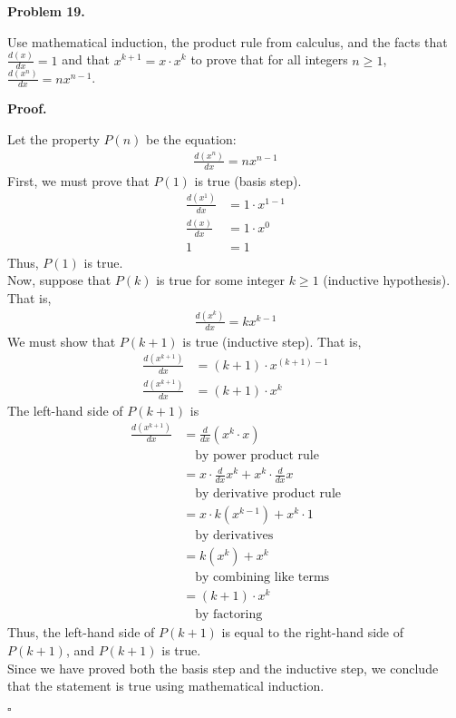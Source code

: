\documentclass{article}
\newenvironment{problem}[1]{
    \begin{mdframed}[backgroundcolor=gray!20, skipabove=\baselineskip, skipbelow=\baselineskip, nobreak=true, innerleftmargin=10pt, innerrightmargin=10pt, innertopmargin=10pt, innerbottommargin=10pt]
    \textbf{Problem #1.}
}{
    \end{mdframed}
}
\newenvironment{proof}{
    \begin{mdframed}[nobreak=false, innerleftmargin=10pt, innerrightmargin=10pt, innertopmargin=10pt, innerbottommargin=10pt]
    \textbf{Proof.}
}{
    \hfill $\square$
    \end{mdframed}
}
\begin{document}
    \begin{problem}{19}
        Use mathematical induction, the product rule from calculus, and the facts that $\frac{d(x)}{dx} = 1$ and that $x^{k+1} = x \cdot x^k$ to prove that for all integers $n \geq 1$, $\frac{d(x^n)}{dx} = nx^{n-1}$.
    \end{problem}
    \begin{proof}
        Let the property $P(n)$ be the equation:
        \begin{align*}
            \frac{d(x^n)}{dx} = nx^{n-1}
        \end{align*}
        First, we must prove that $P(1)$ is true (basis step). \\
        \begin{align*}
            \frac{d(x^1)}{dx} &= 1 \cdot x^{1-1} \\
            \frac{d(x)}{dx} &= 1 \cdot x^{0} \\
            1 &= 1
        \end{align*}
        Thus, $P(1)$ is true. \\
        Now, suppose that $P(k)$ is true for some integer $k \geq 1$ (inductive hypothesis). That is,
        \begin{align*}
            \frac{d(x^k)}{dx} = kx^{k-1}
        \end{align*}
        We must show that $P(k+1)$ is true (inductive step). That is,
        \begin{align*}
            \frac{d(x^{k+1})}{dx} &= (k+1) \cdot x^{(k+1)-1} \\
            \frac{d(x^{k+1})}{dx} &= (k+1) \cdot x^{k}
        \end{align*}
        The left-hand side of $P(k+1)$ is
        \begin{align*}
            \frac{d(x^{k+1})}{dx} &=\frac{d}{dx}(x^k \cdot x) \\
            & \quad \text{by power product rule} \\
            &= x \cdot \frac{d}{dx}x^k + x^k \cdot \frac{d}{dx}x \\
            & \quad \text{by derivative product rule} \\
            &= x \cdot k(x^{k-1}) + x^k \cdot 1\\
            & \quad \text{by derivatives} \\
            &= k(x^k) + x^k \\
            & \quad \text{by combining like terms} \\
            &= (k+1) \cdot x^k \\
            & \quad \text{by factoring}
        \end{align*}
        Thus, the left-hand side of $P(k+1)$ is equal to the right-hand side of $P(k+1)$, and $P(k+1)$ is true. \\
        Since we have proved both the basis step and the inductive step, we conclude that the statement is true using mathematical induction.
    \end{proof}
\end{document}

